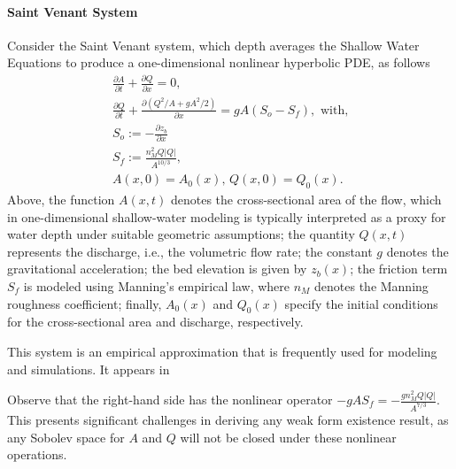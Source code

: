\documentclass{article}
\newcommand{\1}{\mathds{1}}          %
\theoremstyle{definition}
\begin{document}
\begin{sloppypar}
\paragraph{Saint Venant System}
Consider the Saint Venant system, which depth averages the Shallow Water Equations to produce a one-dimensional nonlinear hyperbolic PDE, as follows
\begin{equation}\label{eq:saintv}
    \begin{array}{l}
    \frac{\partial A}{\partial t}+\frac{\partial Q}{\partial x} = 0,\\
    \frac{\partial Q}{\partial t} +\frac{\partial(Q^2/A+g A^2/2)}{\partial x}=gA(S_o-S_f),\text{ with,} \\
    S_o := -\frac{\partial z_b}{\partial x} \\
    S_f := \frac{n_M^2 Q |Q|}{A^{10/3}} ,\\
    A(x,0)=A_0(x),\,Q(x,0)=Q_0(x).
    \end{array}
\end{equation}
Above, the function $A(x,t)$ denotes the cross-sectional area of the flow, which in one-dimensional shallow-water modeling is typically interpreted as a proxy for water depth under suitable geometric assumptions; the quantity $Q(x,t)$ represents the discharge, i.e., the volumetric flow rate; the constant $g$ denotes the gravitational acceleration; the bed elevation is given by $z_b(x)$; the friction term $S_f$ is modeled using Manning's empirical law, where $n_M$ denotes the Manning roughness coefficient; finally, $A_0(x)$ and $Q_0(x)$ specify the initial conditions for the cross-sectional area and discharge, respectively.

This system is an empirical approximation that is frequently used for modeling and simulations. It appears in~\cite{castro2019shallow}

Observe that the right-hand side has the nonlinear operator $-gAS_f=-\frac{gn^2_M Q\vert Q\vert}{A^{7/3}}$. This presents significant challenges in deriving any weak form existence result, as any Sobolev space for $A$ and $Q$ will not be closed under these nonlinear operations. 



\end{sloppypar}
\end{document}
